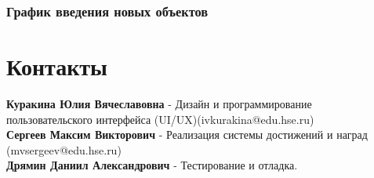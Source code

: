 \documentclass{article}
\begin{document}
\subsubsection{График введения новых объектов}
\newpage

\section{Контакты}

\textbf{Куракина Юлия Вячеславовна} - Дизайн и программирование пользовательского интерфейса (UI/UX)(ivkurakina@edu.hse.ru)\\
\textbf{Сергеев Максим Викторович} - Реализация системы достижений и наград (mvsergeev@edu.hse.ru)\\
\textbf{Дрямин Даниил Александрович} - Тестирование и отладка.\\
\end{document}
